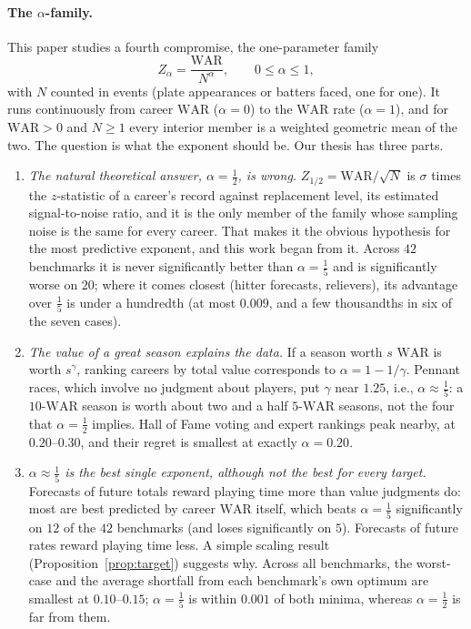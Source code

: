 \documentclass[11pt,letterpaper]{article}
\theoremstyle{plain}
\theoremstyle{definition}
\theoremstyle{remark}
\newcommand{\WAR}{\mathrm{WAR}}
\begin{document}
\paragraph{The $\alpha$-family.} This paper studies a fourth compromise, the one-parameter family
\begin{equation*}
    Z_\alpha = \frac{\WAR}{N^{\alpha}}, \qquad 0 \le \alpha \le 1,
\end{equation*}
with $N$ counted in events (plate appearances or batters faced, one for one). It runs continuously from career $\WAR$ ($\alpha = 0$) to the $\WAR$ rate ($\alpha = 1$), and for $\WAR > 0$ and $N \ge 1$ every interior member is a weighted geometric mean of the two. The question is what the exponent should be. Our thesis has three parts.
\begin{enumerate}
    \item[(1)] \emph{The natural theoretical answer, $\alpha = \tfrac12$, is wrong.} $Z_{1/2} = \WAR/\sqrt N$ is $\sigma$ times the $z$-statistic of a career's record against replacement level, its estimated signal-to-noise ratio, and it is the only member of the family whose sampling noise is the same for every career. That makes it the obvious hypothesis for the most predictive exponent, and this work began from it. Across $42$ benchmarks it is never significantly better than $\alpha = \tfrac15$ and is significantly worse on $20$; where it comes closest (hitter forecasts, relievers), its advantage over $\tfrac15$ is under a hundredth (at most $0.009$, and a few thousandths in six of the seven cases).
    \item[(2)] \emph{The value of a great season explains the data.} If a season worth $s$ $\WAR$ is worth $s^{\gamma}$, ranking careers by total value corresponds to $\alpha = 1 - 1/\gamma$. Pennant races, which involve no judgment about players, put $\gamma$ near $1.25$, i.e., $\alpha \approx \tfrac15$: a $10$-$\WAR$ season is worth about two and a half $5$-$\WAR$ seasons, not the four that $\alpha = \tfrac12$ implies. Hall of Fame voting and expert rankings peak nearby, at $0.20$--$0.30$, and their regret is smallest at exactly $\alpha = 0.20$.
    \item[(3)] \emph{$\alpha \approx \tfrac15$ is the best single exponent, although not the best for every target.} Forecasts of future totals reward playing time more than value judgments do: most are best predicted by career $\WAR$ itself, which beats $\alpha = \tfrac15$ significantly on $12$ of the $42$ benchmarks (and loses significantly on $5$). Forecasts of future rates reward playing time less. A simple scaling result (Proposition~\ref{prop:target}) suggests why. Across all benchmarks, the worst-case and the average shortfall from each benchmark's own optimum are smallest at $0.10$--$0.15$; $\alpha = \tfrac15$ is within $0.001$ of both minima, whereas $\alpha = \tfrac12$ is far from them.
\end{enumerate}
\end{document}
